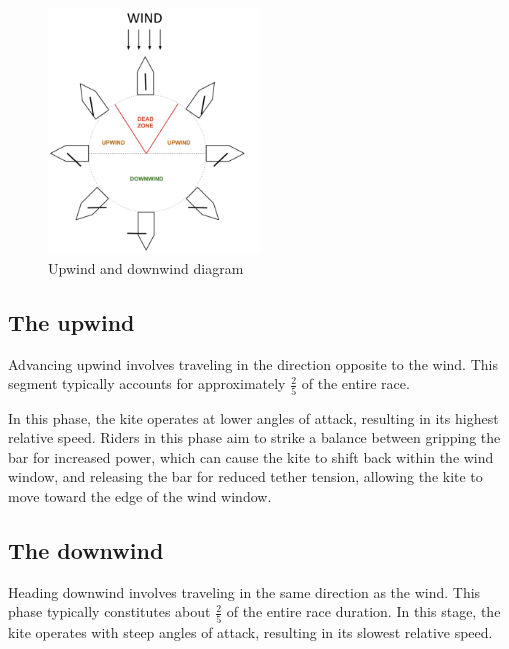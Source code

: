 \begin{figure}[H]
    \centering
    \includegraphics[width=0.5\textwidth]{figures/2D steady simulations/upwind_downwind_scheme.png}
    \caption{Upwind and downwind diagram}
    \label{fig:upwind_downwind_scheme}
\end{figure}


\subsection{The upwind}
\label{sub:Ch1.3.1}

Advancing upwind involves traveling in the direction opposite to the wind. This segment typically accounts for approximately $\frac{2}{5}$ of the entire race. 

In this phase, the kite operates at lower angles of attack, resulting in its highest relative speed. Riders in this phase aim to strike a balance between gripping the bar for increased power, which can cause the kite to shift back within the wind window, and releasing the bar for reduced tether tension, allowing the kite to move toward the edge of the wind window.


\subsection{The downwind}
\label{sub:Ch1.3.1}

Heading downwind involves traveling in the same direction as the wind. This phase typically constitutes about $\frac{2}{5}$ of the entire race duration. In this stage, the kite operates with steep angles of attack, resulting in its slowest relative speed.

